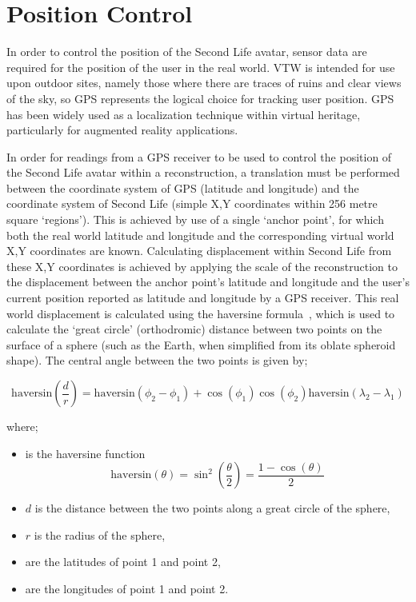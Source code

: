 \section{Position Control}
\label{second_life_position_control}

In order to control the position of the Second Life avatar, sensor data are required for the position of the user in the real world. VTW is intended for use upon outdoor sites, namely those where there are traces of ruins and clear views of the sky, so GPS represents the logical choice for tracking user position. GPS has been widely used as a localization technique within virtual heritage, particularly for augmented reality applications.


In order for readings from a GPS receiver to be used to control the position of the Second Life avatar within a reconstruction, a translation must be performed between the coordinate system of GPS (latitude and longitude) and the coordinate system of Second Life (simple X,Y coordinates within 256 metre square `regions'). This is achieved by use of a single `anchor point', for which both the real world latitude and longitude and the corresponding virtual world X,Y coordinates are known. Calculating displacement within Second Life from these X,Y coordinates is achieved by applying the scale of the reconstruction to the displacement between the anchor point's latitude and longitude and the user's current position reported as latitude and longitude by a GPS receiver. This real world displacement is calculated using the haversine formula~\cite{VanBrummelen2012}, which is used to calculate the `great circle' (orthodromic) distance between two points on the surface of a sphere (such as the Earth, when simplified from its oblate spheroid shape). The central angle  between the two points is given by;

\begin{equation}
\label{haversine1}
\text{haversin}\left(\frac{d}{r}\right) = \text{haversin}(\phi_{2}-\phi_{1})+\cos(\phi_{1})\cos(\phi_{2})\text{haversin}(\lambda_{2}-\lambda_{1})
\end{equation}

where;

\begin{itemize}
	\item {} is the haversine function
		\begin{equation}
		\label{harsine2}
			\text{haversin}(\theta) = \sin^{2}\left( \frac{\theta}{2}\right) = \frac{1-\cos(\theta)}{2}
		\end{equation}
	\item $d$ is the distance between the two points along a great circle of the sphere,
	\item $r$ is the radius of the sphere,
	\item {} are the latitudes of point 1 and point 2,
	\item {} are the longitudes of point 1 and point 2.
\end{itemize}

